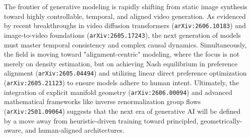 \documentclass[11pt]{article}
\begin{document}
The frontier of generative modeling is rapidly shifting from static image synthesis toward highly controllable, temporal, and aligned video generation. As evidenced by recent breakthroughs in video diffusion transformers (\texttt{arXiv:2606.10183}) and image-to-video foundations (\texttt{arXiv:2605.17243}), the next generation of models must master temporal consistency and complex causal dynamics. Simultaneously, the field is moving toward "alignment-centric" modeling, where the focus is not merely on density estimation, but on achieving Nash equilibrium in preference alignment (\texttt{arXiv:2605.04494}) and utilizing linear direct preference optimization (\texttt{arXiv:2605.21123}) to ensure models adhere to human intent. Ultimately, the integration of explicit manifold geometry (\texttt{arXiv:2606.00094}) and advanced mathematical frameworks like inverse renormalization group flows (\texttt{arXiv:2501.09064}) suggests that the next era of generative AI will be defined by a move away from heuristic-driven training toward principled, geometrically-aware, and human-aligned architectures.
\end{document}
